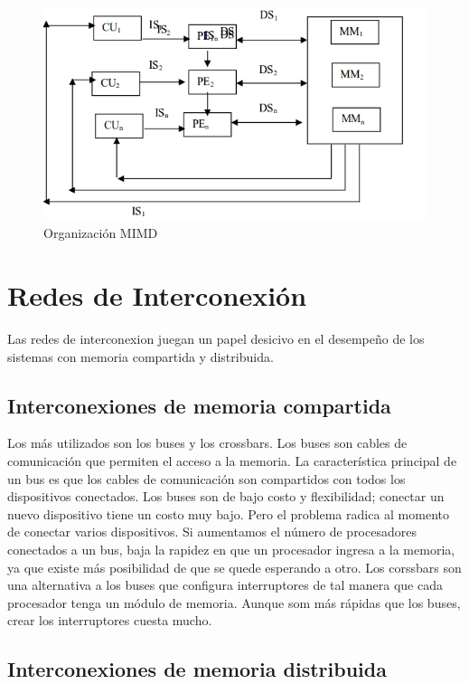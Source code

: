 \documentclass[a4paper,12pt]{article}
\begin{document}
\begin{figure}
 \centering
 \includegraphics[scale=0.5]{6.png}
 \caption{Organización MIMD}
 \label{fig:mimd}
\end{figure}

\section{Redes de Interconexión}

Las redes de interconexion juegan un papel desicivo en el desempeño de los sistemas con memoria compartida y distribuida.

\subsection{Interconexiones de memoria compartida}

Los más utilizados son los buses y los crossbars. Los buses son cables de comunicación que permiten el acceso a la memoria.
La característica principal de un bus es que los cables de comunicación son compartidos con todos los dispositivos conectados.
Los buses son de bajo costo y flexibilidad; conectar un nuevo dispositivo tiene un costo muy bajo. Pero el problema radica al momento
de conectar varios dispositivos. Si aumentamos el número de procesadores conectados a un bus, baja la rapidez en que un procesador ingresa
a la memoria, ya que existe más posibilidad de que se quede esperando a otro. Los corssbars son una alternativa a los buses
que configura interruptores de tal manera que cada procesador tenga un módulo de memoria. Aunque som más rápidas que los buses, crear
los interruptores cuesta mucho.

\subsection{Interconexiones de memoria distribuida}
\end{document}
